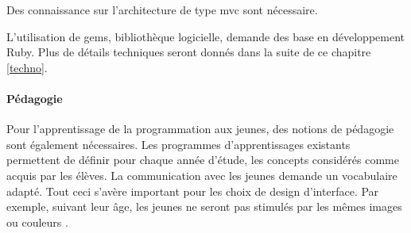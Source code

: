 Des connaissance sur l'architecture de type \gls{mvc} sont nécessaire.

L'utilisation de \glspl{gem}, bibliothèque logicielle, demande des base en développement Ruby. Plus de détails techniques seront donnés dans la suite de ce chapitre \ref{techno}. %

\paragraph{Pédagogie}
Pour l'apprentissage de la programmation aux jeunes, des notions de pédagogie sont également nécessaires.
Les programmes d'apprentissages existants permettent de définir pour chaque année d'étude, les concepts considérés comme acquis par les élèves. La communication avec les jeunes demande un vocabulaire adapté. Tout ceci s'avère important pour les choix de design d'interface. Par exemple, suivant leur âge, les jeunes ne seront pas stimulés par les mêmes images ou couleurs \cite{color}. %


